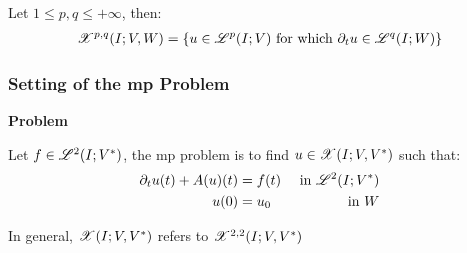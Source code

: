 \begin{frame}
\begin{center}
        \begin{minipage}{0.75\textwidth}
            \begin{definition}
                Let $1 \leq p, q \leq +\infty$, then:
                \begin{align*}
                    \mathscr{X}^{p, q}(I; V, W) = \left\{ u \in \mathscr{L}^{p}(I; V) \text{ for which } \partial_t u \in \mathscr{L}^{q}(I; W) \right\}
                \end{align*}
            \end{definition}
        \end{minipage}
    \end{center}
    \vspace*{\fill}
    
\end{frame}

\begin{frame}
    \frametitle{Setting of the \acrfull{mp} Problem}

    \vspace*{\fill}
    \begin{center}
        {\color{\accentcolor} \Large \textbf{Problem}}
        \vspace*{0.25cm}

        \begin{minipage}{0.75\textwidth}
            \begin{definition}
                Let $f \in \mathscr{L}^{2}(I; V^*)$, the \acrshort{mp} problem is to find $u \in \mathscr{X}(I; V, V^*)$ such that:
                \begin{align*}
                        \partial_t u(t) + A(u)(t) &= f(t) & \text{ in } \mathscr{L}^{2}(I; V^*) \\
                        u(0) &= u_0 & \text{ in } W
                \end{align*}
            \end{definition}
        \end{minipage}
    \end{center}

    \vspace*{\fill}

    \begin{flushleft}
        \begin{minipage}{0.75\textwidth}
            {\footnotesize In general, $\mathscr{X}(I; V, V^*)$ refers to $\mathscr{X}^{2, 2}(I; V, V^*)$ }
        \end{minipage}
    \end{flushleft}
    
\end{frame}


